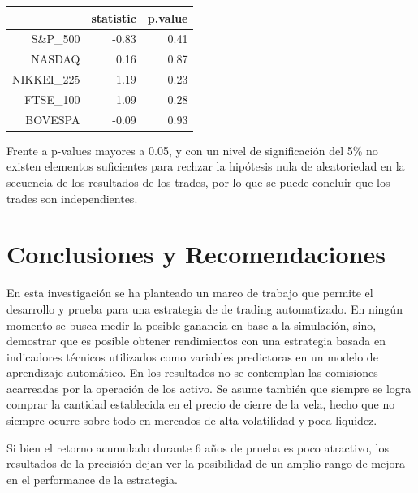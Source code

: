 \documentclass[a4paper,12pt]{Latex/Classes/PhDthesisPSnPDF}
\begin{document}
 
\begin{center}
\begin{table}[ht]
\centering
\begin{tabular}{rrr}
  \hline
 & statistic & p.value \\ 
  \hline
S\&P\_500 & -0.83 & 0.41 \\ 
  NASDAQ & 0.16 & 0.87 \\ 
  NIKKEI\_225 & 1.19 & 0.23 \\ 
  FTSE\_100 & 1.09 & 0.28 \\ 
  BOVESPA & -0.09 & 0.93 \\ 
   \hline
\end{tabular}
\end{table}\end{center}

Frente a p-values mayores a 0.05, y con un nivel de significación del 5\% no existen elementos suficientes para rechzar la hipótesis nula de aleatoriedad en la secuencia de los resultados de los trades, por lo que se puede concluir que los trades son independientes.
  

\chapter*{Conclusiones y Recomendaciones}

En esta investigación se ha planteado un marco de trabajo que permite el desarrollo y prueba para una estrategia de de trading automatizado. En ningún momento se busca medir la posible ganancia en base a la simulación, sino, demostrar que es posible obtener rendimientos con una estrategia basada en indicadores técnicos utilizados como variables predictoras en un modelo de aprendizaje automático. En los resultados no se contemplan las comisiones acarreadas por la operación de los activo. Se asume también que siempre se logra comprar la cantidad establecida en el precio de cierre de la vela, hecho que no siempre ocurre sobre todo en mercados de alta volatilidad y poca liquidez.

Si bien el retorno acumulado durante 6 años de prueba es poco atractivo, los resultados de la precisión dejan ver la posibilidad de un amplio rango de mejora en el performance de la estrategia.
\end{document}
